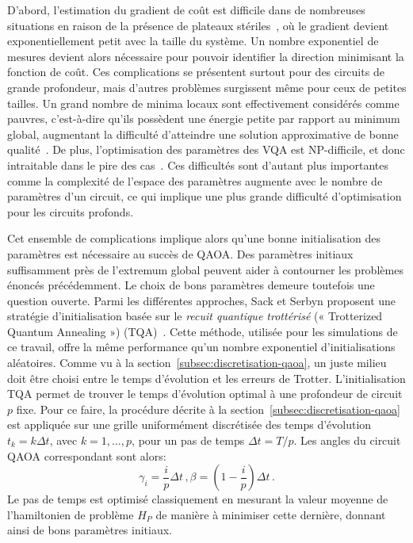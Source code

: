 D'abord, l'estimation du gradient de coût est difficile dans de nombreuses situations en raison de la présence de plateaux stériles~\cite{mccleanBarrenPlateausQuantum2018, laroccaReviewBarrenPlateaus2024}, où le gradient devient exponentiellement petit avec la taille du système. Un nombre exponentiel de mesures devient alors nécessaire pour pouvoir identifier la direction minimisant la fonction de coût. Ces complications se présentent surtout pour des circuits de grande profondeur, mais d'autres problèmes surgissent même pour ceux de petites tailles. Un grand nombre de minima locaux sont effectivement considérés comme pauvres, c'est-à-dire qu'ils possèdent une énergie petite par rapport au minimum global, augmentant la difficulté d'atteindre une solution approximative de bonne qualité~\cite{anschuetzQuantumVariationalAlgorithms2022}. De plus, l'optimisation des paramètres des VQA est \textsf{NP}-difficile, et donc intraitable dans le pire des cas~\cite{bittelTrainingVariationalQuantum2021}. Ces difficultés sont d'autant plus importantes comme la complexité de l'espace des paramètres augmente avec le nombre de paramètres d'un circuit, ce qui implique une plus grande difficulté d'optimisation pour les circuits profonds. 

Cet ensemble de complications implique alors qu'une bonne initialisation des paramètres est nécessaire au succès de QAOA. Des paramètres initiaux suffisamment près de l'extremum global peuvent aider à contourner les problèmes énoncés précédemment. Le choix de bons paramètres demeure toutefois une question ouverte. Parmi les différentes approches, Sack et Serbyn proposent une stratégie d'initialisation basée sur le \textit{recuit quantique trottérisé} (« Trotterized Quantum Annealing ») (TQA)~\cite{sackQuantumAnnealingInitialization2021}. Cette méthode, utilisée pour les simulations de ce travail, offre la même performance qu'un nombre exponentiel d'initialisations aléatoires. Comme vu à la section~\ref{subsec:discretisation-qaoa}, un juste milieu doit être choisi entre le temps d'évolution et les erreurs de Trotter. L'initialisation TQA permet de trouver le temps d'évolution optimal à une profondeur de circuit $p$ fixe. Pour ce faire, la procédure décrite à la section~\ref{subsec:discretisation-qaoa} est appliquée sur une grille uniformément discrétisée des temps d'évolution $t_{k} = k \Delta t$, avec $k = 1,\dots, p$, pour un pas de temps $\Delta t = T / p$. Les angles du circuit QAOA correspondant sont alors:
\begin{equation}
    \gamma_{i} = \frac{i}{p} \Delta t \,, \beta = (1 - \frac{i}{p}) \Delta t \,.
\end{equation}
Le pas de temps est optimisé classiquement en mesurant la valeur moyenne de l'hamiltonien de problème $H_{P}$ de manière à minimiser cette dernière, donnant ainsi de bons paramètres initiaux.

